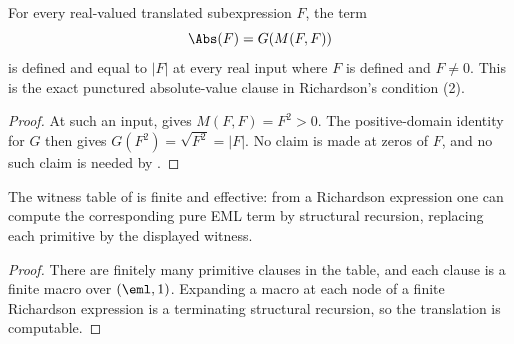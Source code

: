 \begin{lemma}
\label{lem:eml-zero-absolute-witness}
For every real-valued translated subexpression \(F\), the term
\[\Abs(F)=G(M(F,F))\]
is defined and equal to \(|F|\) at every real input where \(F\) is defined and
\(F\ne0\).  This is the exact punctured absolute-value clause in Richardson's
condition (2).
\end{lemma}

\begin{proof}
At such an input,  gives
\(M(F,F)=F^2>0\).  The positive-domain identity for \(G\) then gives
\(G(F^2)=\sqrt{F^2}=|F|\).  No claim is made at zeros of \(F\), and no such claim
is needed by .
\end{proof}

\begin{corollary}
\label{cor:finite-richardson-witness-library}
The witness table of  is finite and effective:
from a Richardson expression one can compute the corresponding pure EML term by
structural recursion, replacing each primitive by the displayed witness.
\end{corollary}

\begin{proof}
There are finitely many primitive clauses in the table, and each clause is a
finite macro over \((\eml,1)\).  Expanding a macro at each node of a finite
Richardson expression is a terminating structural recursion, so the translation
is computable.
\end{proof}

